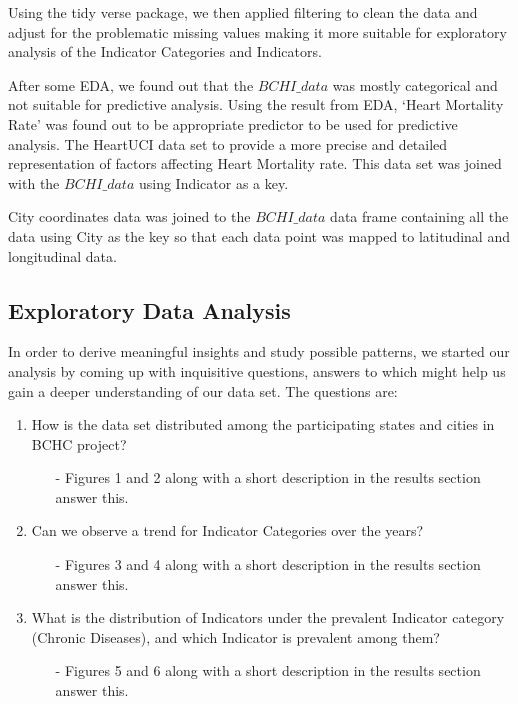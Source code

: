 \documentclass[11pt]{article}
\begin{document}
\begin{multicols}{2}
    Using the tidy verse package, we then applied filtering to clean the data and adjust for the problematic missing values making it more suitable for exploratory analysis of the Indicator Categories and Indicators. 

    After some EDA, we found out that the $BCHI\_data$  was mostly categorical and not suitable for predictive analysis. Using the result from EDA, ‘Heart Mortality Rate’ was found out to be appropriate predictor to be used for predictive analysis. The HeartUCI \cite{hduci} data set to provide a more precise and detailed representation of factors affecting Heart Mortality rate. This data set was joined with the $BCHI\_data$  using Indicator as a key.

    City coordinates data was joined to the $BCHI\_data$ data frame containing all the data using City as the key so that each data point was mapped to latitudinal and longitudinal data.
    \subsection{Exploratory Data Analysis}
    In order to derive meaningful insights and study possible patterns, we started our analysis by coming up with inquisitive questions, answers to which might help us gain a deeper understanding of our data set. The questions are:
    \begin{enumerate}
        \item How is the data set distributed among the participating states and cities in BCHC project? 
        \begin{itemize}
            \item[-] Figures 1 and 2 along with a short description in the results section answer this. 
        \end{itemize}
        \item Can we observe a trend for Indicator Categories over the years?  
        \begin{itemize}
            \item[-] Figures 3 and 4 along with a short description in the results section answer this. 
        \end{itemize}
        \item What is the distribution of Indicators under the prevalent Indicator category (Chronic Diseases), and which Indicator is prevalent among them? 
        \begin{itemize}
            \item[-] Figures 5 and 6 along with a short description in the results section answer this. 
        \end{itemize}
    \end{enumerate}


\end{multicols}
\end{document}
